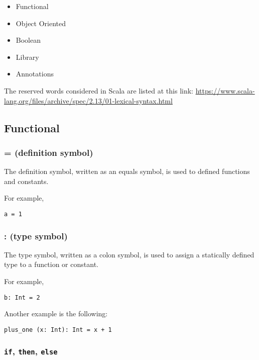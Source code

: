 \documentclass[12pt,a4paper]{article}
\newcommand{\srccode}[1]{\texttt{{#1}}}
\newcommand{\reservedWord}[1]{{\color{blue}\srccode{#1}}\xspace}
\newcommand{\sif}{\reservedWord{if}}
\newcommand{\sthen}{\reservedWord{then}}
\newcommand{\selse}{\reservedWord{else}}
\begin{document}
    \begin{itemize}
        \item Functional
        \item Object Oriented
        \item Boolean
        \item Library
        \item Annotations
    \end{itemize}


    The reserved words considered in Scala are listed at this link:
    \url{https://www.scala-lang.org/files/archive/spec/2.13/01-lexical-syntax.html}

    \subsection{Functional}

    \subsubsection{= (definition symbol)}

    The definition symbol, written as an equals symbol, is used to defined functions and constants.

    For example,
    \begin{lstlisting}[label={lst:exampleDef}]
  a = 1
    \end{lstlisting}

    \subsubsection{: (type symbol)}

    The type symbol, written as a colon symbol, is used to assign a statically defined type to a function or constant.

    For example,
    \begin{lstlisting}[label={lst:exampleType01}]
  b: Int = 2
    \end{lstlisting}

    Another example is the following:
    \begin{lstlisting}[label={lst:exampleType02}]
  plus_one (x: Int): Int = x + 1
    \end{lstlisting}

    \subsubsection{\sif, \sthen, \selse}
\end{document}
